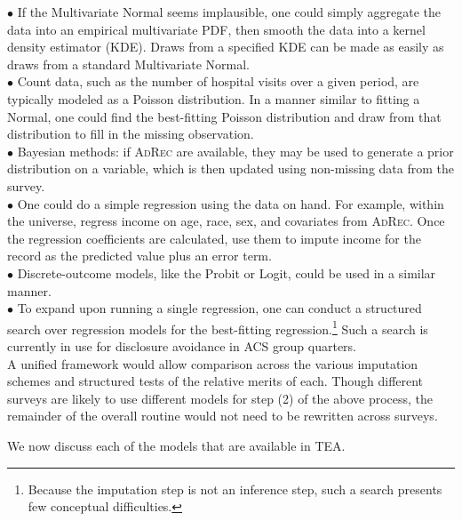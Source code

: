 \documentclass{article}
\def\adrec{\textsc{AdRec}\xspace}
\begin{document}
$\bullet$ If the Multivariate Normal seems implausible, one could simply aggregate the
data into an empirical multivariate PDF, then smooth the data into a kernel
density estimator (KDE). Draws from a specified KDE can be made as easily as
draws from a standard Multivariate Normal.\\

$\bullet$ Count data, such as the number of hospital visits over a given period, are
typically modeled as a Poisson distribution. In a manner similar to fitting a Normal, one
could find the best-fitting Poisson distribution and draw from that distribution to fill
in the missing observation.\\

$\bullet$ Bayesian methods: if \adrec are available, they may be used to generate a prior distribution
on a variable, which is then updated using non-missing data from the survey.\\

$\bullet$ One could do a simple regression using the data on hand. For example,
within the universe, regress income on  age, race, sex, and covariates from \adrec.
Once the regression coefficients are calculated, use them to impute income for
the record as the predicted value plus an error term. \\

$\bullet$ Discrete-outcome models, like the Probit or Logit, could be used in a similar
manner.\\

$\bullet$ To expand upon running a single regression, one can conduct a structured search
over regression models for the best-fitting regression.\footnote{Because the imputation
step is not an inference step, such a search presents few conceptual difficulties.}
Such a search is currently in use for disclosure avoidance in ACS group quarters.\\

A unified framework would allow comparison across the various imputation
schemes and structured tests of the relative merits of each. Though different surveys
are likely to use different models for step (2) of the above process, the
remainder of the overall routine would not need to be rewritten across surveys.

We now discuss each of the models that are available in TEA.
\end{document}
